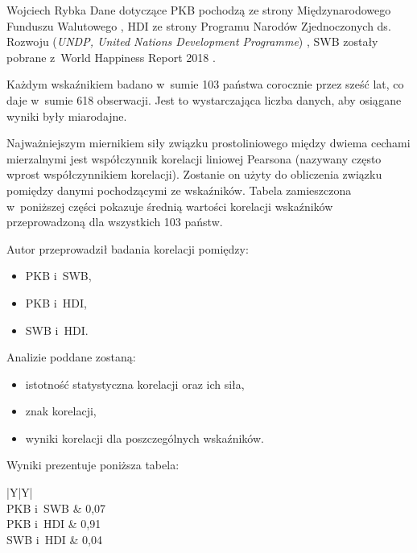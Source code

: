 \begin{artplenv}{Wojciech Rybka}
Dane dotyczące PKB pochodzą ze strony Międzynarodowego Funduszu Walutowego
\parencite{international_monetary_fund_world_2019a},
HDI ze strony Programu Narodów Zjednoczonych ds. Rozwoju (\textit{UNDP, United Nations
Development Programme})
\parencite{united_nations_development_programme_human_2019},
SWB zostały
pobrane z~World Happiness Report 2018
\parencite{noauthor_world_2018}.

Każdym wskaźnikiem badano w~sumie 103 państwa corocznie przez sześć lat, co daje w~sumie 618 obserwacji. Jest to
wystarczająca liczba danych, aby osiągane wyniki były miarodajne. 

Najważniejszym miernikiem siły związku prostoliniowego między dwiema cechami mierzalnymi jest współczynnik korelacji
liniowej Pearsona (nazywany często wprost współczynnikiem korelacji). Zostanie on użyty do obliczenia związku pomiędzy
danymi pochodzącymi ze wskaźników. Tabela zamieszczona w~poniższej części pokazuje średnią wartości korelacji
wskaźników przeprowadzoną dla wszystkich 103 państw.

Autor przeprowadził badania korelacji pomiędzy:

\begin{itemize}
\item PKB i~SWB,
\item PKB i~HDI,
\item SWB i~HDI.
\end{itemize}
Analizie poddane zostaną:

\begin{itemize}
\item istotność statystyczna korelacji oraz ich siła,
\item znak korelacji,
\item wyniki korelacji dla poszczególnych wskaźników.
\end{itemize}
Wyniki prezentuje poniższa tabela:


\captionsetup[table]{name=Tabela}
\begin{table}[H]
	\begin{tabularx}{\textwidth}{|Y|Y|}
		\hline
		\\\hline
		PKB i~SWB &
		0,07\\\hline
		PKB i~HDI &
		0,91\\\hline
		SWB i~HDI &
		0,04\\\hline
	\end{tabularx}
	

\end{table}
\end{artplenv}
